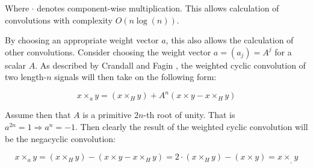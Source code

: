 Where $\cdot$ denotes component-wise multiplication. This allows calculation of
convolutions with complexity $O(n \log(n))$.

By choosing an appropriate weight vector $a$, this also allows the calculation
of other convolutions. Consider choosing the weight vector $a = (a_j) = A^j$
for a scalar $A$. As described by Crandall and Fagin
\autocite{crandallDiscreteWeightedTransforms1994}, the weighted cyclic
convolution of two length-$n$ signals will then take on the following form:

\[
		x \times_a y = (x \times_H y)  + A^n (x \times y - x \times_H y)
\]

Assume then that $A$ is a primitive $2n$-th root of unity. That is $a^{2n} = 1
\Rightarrow a^n = -1$. Then clearly the result of the weighted cyclic
convolution will be the negacyclic convolution:

\[
		x \times_a y = (x \times_H y) - (x \times y - x \times_H y) = 2 \cdot (x \times_H y) - (x \times y) = x \times_\_ y
\]
